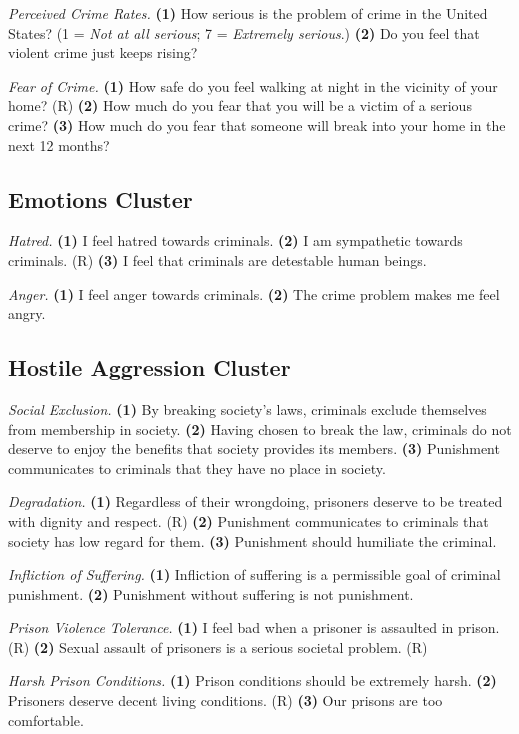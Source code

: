 \textit{Perceived Crime Rates.} \textbf{(1)} How serious is the problem of crime in the United States? (1 = \textit{Not at all serious}; 7 = \textit{Extremely serious}.) \textbf{(2)} Do you feel that violent crime just keeps rising?

\textit{Fear of Crime.} \textbf{(1)} How safe do you feel walking at night in the vicinity of your home? (R) \textbf{(2)} How much do you fear that you will be a victim of a serious crime? \textbf{(3)} How much do you fear that someone will break into your home in the next 12 months?

\subsection{Emotions Cluster}

\textit{Hatred.} \textbf{(1)} I feel hatred towards criminals. \textbf{(2)} I am sympathetic towards criminals. (R) \textbf{(3)} I feel that criminals are detestable human beings.

\textit{Anger.} \textbf{(1)} I feel anger towards criminals. \textbf{(2)} The crime problem makes me feel angry.

\subsection{Hostile Aggression Cluster}

\textit{Social Exclusion.} \textbf{(1)} By breaking society's laws, criminals exclude themselves from membership in society. \textbf{(2)} Having chosen to break the law, criminals do not deserve to enjoy the benefits that society provides its members. \textbf{(3)} Punishment communicates to criminals that they have no place in society.

\textit{Degradation.} \textbf{(1)} Regardless of their wrongdoing, prisoners deserve to be treated with dignity and respect. (R) \textbf{(2)} Punishment communicates to criminals that society has low regard for them. \textbf{(3)} Punishment should humiliate the criminal.

\textit{Infliction of Suffering.} \textbf{(1)} Infliction of suffering is a permissible goal of criminal punishment. \textbf{(2)} Punishment without suffering is not punishment.

\textit{Prison Violence Tolerance.} \textbf{(1)} I feel bad when a prisoner is assaulted in prison. (R) \textbf{(2)} Sexual assault of prisoners is a serious societal problem. (R)

\textit{Harsh Prison Conditions.} \textbf{(1)} Prison conditions should be extremely harsh. \textbf{(2)} Prisoners deserve decent living conditions. (R) \textbf{(3)} Our prisons are too comfortable.

